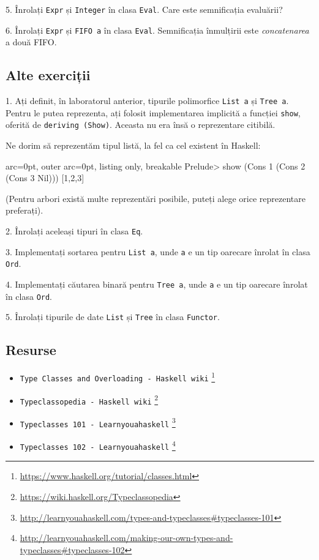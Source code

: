 5. Înrolați \texttt{Expr} și \texttt{Integer} în clasa \texttt{Eval}. Care este semnificația evaluării?

6. Înrolați \texttt{Expr} și \texttt{FIFO a} în clasa \texttt{Eval}. Semnificația înmulțirii este \textit{concatenarea} a două FIFO. 

\subsection*{ Alte exerciții }

1. Ați definit, în laboratorul anterior, tipurile polimorfice \texttt{List a} și \texttt{Tree a}. Pentru le putea reprezenta, ați folosit implementarea implicită a funcției \texttt{show}, oferită de \texttt{deriving (Show)}. Aceasta nu era însă o reprezentare citibilă.

Ne dorim să reprezentăm tipul listă, la fel ca cel existent în Haskell:


\begin{tcblisting}{ arc=0pt, outer arc=0pt, listing only, breakable}
Prelude> show (Cons 1 (Cons 2 (Cons 3 Nil)))
[1,2,3]

\end{tcblisting}


(Pentru arbori există multe reprezentări posibile, puteți alege orice reprezentare preferați).

2. Înrolați aceleași tipuri în clasa \texttt{Eq}.

3. Implementați sortarea pentru \texttt{List a}, unde \texttt{a} e un tip oarecare înrolat în clasa \texttt{Ord}.
 
4. Implementați căutarea binară pentru \texttt{Tree a}, unde \texttt{a} e un tip oarecare înrolat în clasa \texttt{Ord}.

5. Înrolați tipurile de date \texttt{List} și \texttt{Tree} în clasa \texttt{Functor}.

\subsection*{ Resurse }

\begin{itemize}
	\item  \texttt{Type Classes and Overloading - Haskell wiki} \footnote{\url{https://www.haskell.org/tutorial/classes.html}}
	\item  \texttt{Typeclassopedia - Haskell wiki} \footnote{\url{https://wiki.haskell.org/Typeclassopedia}}
	\item  \texttt{Typeclasses 101 - Learnyouahaskell} \footnote{\url{http://learnyouahaskell.com/types-and-typeclasses\#typeclasses-101}}
	\item  \texttt{Typeclasses 102 - Learnyouahaskell} \footnote{\url{http://learnyouahaskell.com/making-our-own-types-and-typeclasses\#typeclasses-102}}
\end{itemize}
